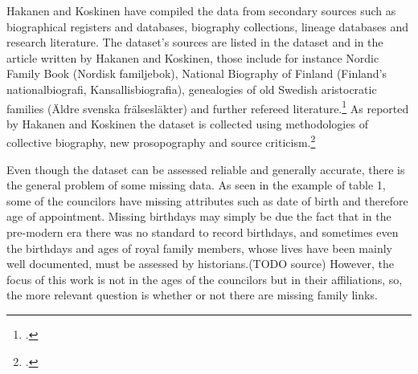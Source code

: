 \documentclass[a4paper,12pt]{article}
\begin{document}
\begin{onehalfspace}
\begin{table}[h]
	\centering
	\caption{Example rows of the dataset: Gyllenhorn, Joen Olsson and Natt och Dag, Måns Johansson (\cite{councilorsDS})} 
\end{table}
 
Hakanen and Koskinen have compiled the data from secondary sources such as biographical registers and databases, biography collections, lineage databases and research literature. The dataset's sources are listed in the dataset and in the article written by Hakanen and Koskinen, those include for instance Nordic Family Book (Nordisk familjebok), National Biography of Finland (Finland's nationalbiografi, Kansallisbiografia), genealogies of old Swedish aristocratic families (Äldre svenska frälsesläkter) and further refereed literature.\footcites[p. 48, 76]{HakanenAKoskinen2017}{councilorsDS} As reported by Hakanen and Koskinen the dataset is collected using methodologies of collective biography, new prosopography and source criticism.\footcite[p. 48.]{HakanenAKoskinen2017}
  
Even though the dataset can be assessed reliable and generally accurate, there is the general problem of some missing data. As seen in the example of table 1, some of the councilors have missing attributes such as date of birth and therefore age of appointment. Missing birthdays may simply be due the fact that in the pre-modern era there was no standard to record birthdays, and sometimes even the birthdays and ages of royal family members, whose lives have been mainly well documented, must be assessed by historians.(TODO source) However, the focus of this work is not in the ages of the councilors but in their affiliations, so, the more relevant question is whether or not there are missing family links. 


\end{onehalfspace}
\end{document}
